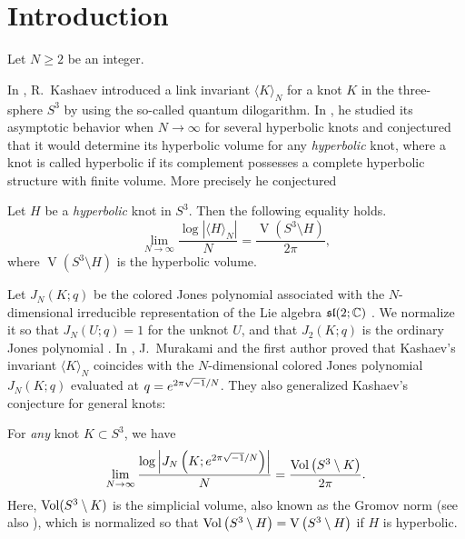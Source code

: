 \section{Introduction}\label{sec:introduction}
Let $N\ge2$ be an integer.
\par
In \cite{Kashaev:MODPLA95}, R.~Kashaev introduced a link invariant $\langle K\rangle_{N}$ for a knot $K$ in the three-sphere $S^3$ by using the so-called quantum dilogarithm.
In \cite{Kashaev:LETMP97}, he studied its asymptotic behavior when $N\to\infty$ for several hyperbolic knots and conjectured that it would determine its hyperbolic volume for any {\em hyperbolic} knot, where a knot is called hyperbolic if its complement possesses a complete hyperbolic structure with finite volume.
More precisely he conjectured
\begin{conj}
Let $H$ be a {\em hyperbolic} knot in $S^3$.
Then the following equality holds.
\begin{equation}\label{eq:Kashaev}
  \lim_{N\to\infty}
  \frac{\log\left|\langle H\rangle_{N}\right|}{N}
  =
  \frac{\operatorname{V}\left(S^3\setminus{H}\right)}{2\pi},
\end{equation}
where $\operatorname{V}\left(S^3\setminus{H}\right)$ is the hyperbolic volume.
\end{conj}
\par
Let $J_{N}(K;q)$ be the colored Jones polynomial associated with the $N$-dimensional irreducible representation of the Lie algebra $\mathfrak{sl}(2;\mathbb{C})$ \cite{Kirby/Melvin:INVEM1991,Reshetikhin/Turaev:INVEM1991}.
We normalize it so that $J_{N}(U;q)=1$ for the unknot $U$, and that $J_{2}(K;q)$ is the ordinary Jones polynomial \cite{Jones:BULAM31985}.
In \cite{Murakami/Murakami:ACTAM12001}, J.~Murakami and the first author proved that Kashaev's invariant $\langle K\rangle_{N}$ coincides with the $N$-dimensional colored Jones polynomial $J_{N}(K;q)$  evaluated at $q=e^{2\pi\sqrt{-1}/N}$.
They also generalized Kashaev's conjecture for general knots:
\begin{conj}
For {\em any} knot $K\subset{S^3}$, we have
\begin{equation}\label{eq:VC}
  \lim_{N\to\infty}
  \frac{\log\left|J_{N}\left(K;e^{2\pi\sqrt{-1}/N}\right)\right|}{N}
  =
  \frac{\operatorname{Vol}\left(S^3\setminus{K}\right)}{2\pi}.
\end{equation}
Here, $\operatorname{Vol}(S^3\setminus{K})$ is the simplicial volume, also known as the Gromov norm \cite{Gromov:INSHE82} {\rm(}see also \cite{Soma:INVEM1981}{\rm)}, which is normalized so that $\operatorname{Vol}\left(S^3\setminus{H}\right)=\operatorname{V}\left(S^3\setminus{H}\right)$ if $H$ is hyperbolic.
\end{conj}
